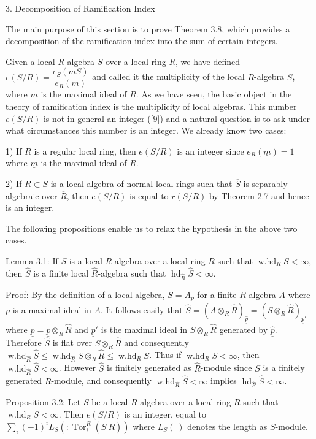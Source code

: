 3. Decomposition of Ramification Index

The main purpose of this section is to prove Theorem 3.8, which provides
a decomposition of the ramification index into the sum of certain integers.

Given a local $R$-algebra $S$ over a local ring $R$, we have defined
$e(S/R)=\dfrac{e_S(mS)}{e_R(m)}$ and called it the multiplicity of the local $R$-algebra
$S$, where $m$ is the maximal ideal of $R$. As we have seen, the basic object
in the theory of ramification index is the multiplicity of local algebras.
This number $e(S/R)$ is not in general an integer ([9]) and a natural
question is to ask under what circumstances this number is an integer.
We already know two cases:

1) If $R$ is a regular local ring, then $e(S/R)$ is an integer since
$e_R(\underline m)=1$ where $\underline m$ is the maximal ideal of $R$.

2) If $R\subset S$ is a local algebra of normal local rings such that $\overline S$ is
separably algebraic over $\overline R$, then $e(S/R)$ is equal to $r(S/R)$ by Theorem 2.7
and hence is an integer.

The following propositions enable us to relax the hypothesis in the
above two cases.

Lemma 3.1: If $S$ is a local $R$-algebra over a local ring $R$ such that
$\operatorname{w.hd}_R S<\infty$, then $\widehat S$ is a finite local $\widehat R$-algebra such that $\operatorname{hd}_{\widehat R}\widehat S<\infty$.

\uline{Proof}: By the definition of a local algebra, $S=A_{\underline p}$ for a finite
$R$-algebra $A$ where $\underline p$ is a maximal ideal in $A$. It follows easily that
$\widehat S=(A\otimes_R\widehat R)_{\widehat{\underline p}}=(S\otimes_R\widehat R)_{\underline p'}$ where $\widehat{\underline p}=\underline p\otimes_R\widehat R$ and $\underline p'$ is the maximal ideal
in $S\otimes_R\widehat R$ generated by $\widehat{\underline p}$. Therefore $\widehat S$ is flat over $S\otimes_R\widehat R$ and consequently
$\operatorname{w.hd}_{\widehat R}\widehat S\leq\operatorname{w.hd}_{\widehat R}S\otimes_R\widehat R\leq\operatorname{w.hd}_R S$.
Thus if $\operatorname{w.hd}_R S<\infty$, then $\operatorname{w.hd}_{\widehat R}\widehat S<\infty$.
However $\widehat S$ is finitely generated as $\widehat R$-module since $\overline S$ is a finitely generated
$R$-module, and consequently $\operatorname{w.hd}_{\widehat R}\widehat S<\infty$ implies $\operatorname{hd}_{\widehat R}\widehat S<\infty$.

Proposition 3.2: Let $S$ be a local $R$-algebra over a local ring $R$ such
that $\operatorname{w.hd}_R S<\infty$. Then $e(S/R)$ is an integer, equal to $\sum_i(-1)^iL_S(:\operatorname{Tor}_i^R(S\ \overline R))$
where $L_S(\ )$ denotes the length as $S$-module.
